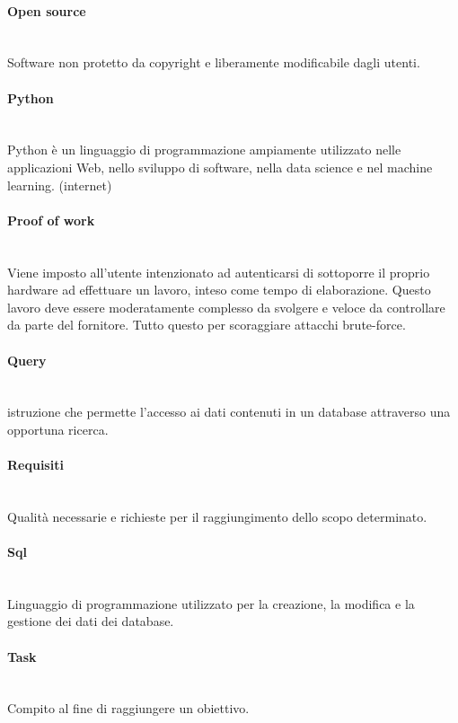 \paragraph{Open source}~\smallskip \\
Software non protetto da copyright e liberamente modificabile dagli utenti.

\paragraph{Python}~\smallskip \\
Python è un linguaggio di programmazione ampiamente utilizzato nelle applicazioni Web, nello sviluppo di software, nella data science e nel machine learning. (internet)

\paragraph{Proof of work}~\smallskip \\
Viene imposto all'utente intenzionato ad autenticarsi di sottoporre il proprio hardware ad effettuare un lavoro, inteso come tempo di elaborazione. Questo lavoro deve essere moderatamente complesso da svolgere e veloce da controllare da parte del fornitore. Tutto questo per scoraggiare attacchi brute-force.

\paragraph{Query}~\smallskip \\
istruzione che permette l'accesso ai dati contenuti in un database attraverso una opportuna ricerca.

\paragraph{Requisiti}~\smallskip \\
Qualità necessarie e richieste per il raggiungimento dello scopo determinato.

\paragraph{Sql}~\smallskip \\
Linguaggio di programmazione utilizzato per la creazione, la modifica e la gestione dei dati dei database.

\paragraph{Task}~\smallskip \\
Compito al fine di raggiungere un obiettivo.